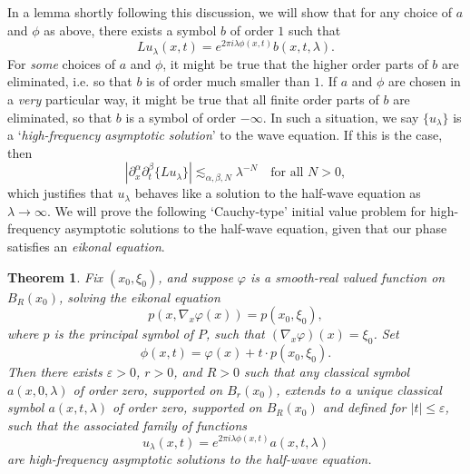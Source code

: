 \documentclass{article}
\theoremstyle{plain}
\newtheorem{theorem}{Theorem}
\theoremstyle{remark}
\theoremstyle{definition}
\begin{document}
%
%
%

In a lemma shortly following this discussion, we will show that for any choice of $a$ and $\phi$ as above, there exists a symbol $b$ of order $1$ such that
%
\[ L u_\lambda(x,t) = e^{2 \pi i \lambda \phi(x,t)} b(x,t,\lambda). \]
%
For \emph{some} choices of $a$ and $\phi$, it might be true that the higher order parts of $b$ are eliminated, i.e. so that $b$ is of order much smaller than $1$. If $a$ and $\phi$ are chosen in a \emph{very} particular way, it might be true that all finite order parts of $b$ are eliminated, so that $b$ is a symbol of order $-\infty$. In such a situation, we say $\{ u_\lambda \}$ is a `\emph{high-frequency asymptotic solution}' to the wave equation. If this is the case, then
%
\[ |\partial_x^\alpha \partial_t^\beta \{ L u_\lambda \}| \lesssim_{\alpha,\beta,N} \lambda^{-N} \quad\text{for all $N > 0$}, \]
which justifies that $u_\lambda$ behaves like a solution to the half-wave equation as $\lambda \to \infty$. We will prove the following `Cauchy-type' initial value problem for high-frequency asymptotic solutions to the half-wave equation, given that our phase satisfies an \emph{eikonal equation}.

\begin{theorem}
	Fix $(x_0,\xi_0)$, and suppose $\varphi$ is a smooth-real valued function on $B_R(x_0)$, solving the eikonal equation
	\[ p(x, \nabla_x \varphi(x) ) = p(x_0,\xi_0), \]
	where $p$ is the principal symbol of $P$, such that $(\nabla_x \varphi)(x) = \xi_0$.
%
 	Set
 	\[ \phi(x,t) = \varphi(x) + t \cdot p(x_0,\xi_0). \]
 	Then there exists $\varepsilon > 0$, $r > 0$, and $R > 0$ such that any classical symbol $a(x,0,\lambda)$ of order zero, supported on $B_r(x_0)$, extends to a unique classical symbol $a(x,t,\lambda)$ of order zero, supported on $B_R(x_0)$ and defined for $|t| \leq \varepsilon$, such that the associated family of functions
	\[ u_\lambda(x,t) = e^{2 \pi i \lambda \phi(x,t)} a(x,t,\lambda) \]
	are high-frequency asymptotic solutions to the half-wave equation.
\end{theorem}
\end{document}
